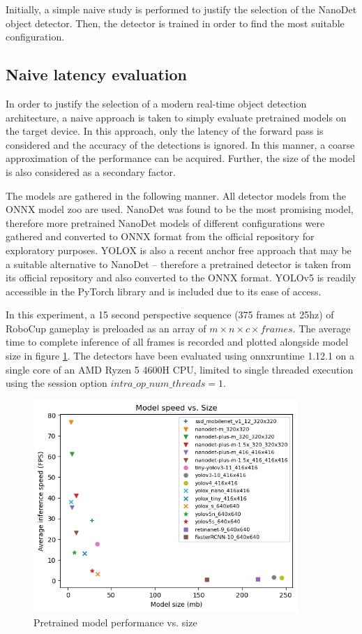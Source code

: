 \documentclass[a4paper,twoside,12pt]{report}
\begin{document}
Initially, a simple naive study is performed to justify the selection of the NanoDet object detector. Then, the detector is trained in order to find the most suitable configuration.

\subsection{Naive latency evaluation}
In order to justify the selection of a modern real-time object detection architecture, a naive approach is taken to simply evaluate pretrained models on the target device. In this approach, only the latency of the forward pass is considered and the accuracy of the detections is ignored. In this manner, a coarse approximation of the performance can be acquired. Further, the size of the model is also considered as a secondary factor.

The models are gathered in the following manner. All detector models from the ONNX model zoo \citep{modelzoo} are used. NanoDet was found to be the most promising model, therefore more pretrained NanoDet models of different configurations were gathered and converted to ONNX format from the official repository for exploratory purposes. YOLOX \citep{yolox} is also a recent anchor free approach that may be a suitable alternative to NanoDet -- therefore a pretrained detector is taken from its official repository \citep{yoloxrepo} and also converted to the ONNX format. YOLOv5 is readily accessible in the PyTorch library and is included due to its ease of access. 

In this experiment, a 15 second perspective sequence (375 frames at 25hz) of RoboCup gameplay is preloaded as an array of $m \times n \times c \times frames$. The average time to complete inference of all frames is recorded and plotted alongside model size in figure \ref{fig:modelspeedsize}. The detectors have been evaluated using onnxruntime 1.12.1 on a single core of an AMD Ryzen 5 4600H CPU, limited to single threaded execution using the session option $intra\_op\_num\_threads = 1$. 

\begin{figure}[h!]
\begin{center}
\includegraphics[width=10cm]{images/modelspeedsize.png}
\caption{Pretrained model performance vs. size}
\label{fig:modelspeedsize}
\end{center}
\end{figure}
\end{document}
